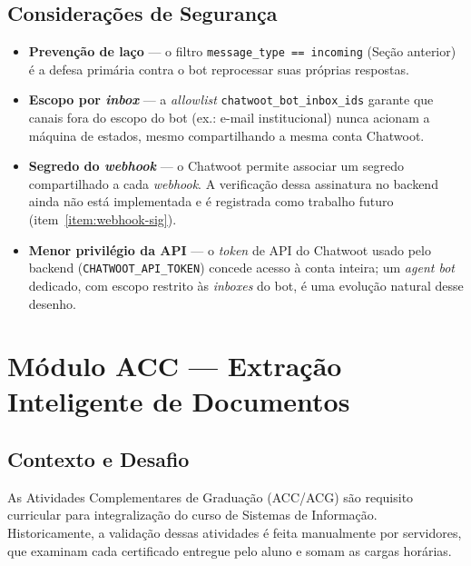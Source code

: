 \documentclass[12pt,a4paper]{report}
\begin{document}
\section{Considerações de Segurança}

\begin{itemize}
  \item \textbf{Prevenção de laço} — o filtro \texttt{message\_type ==
        incoming} (Seção anterior) é a defesa primária contra o bot
        reprocessar suas próprias respostas.
  \item \textbf{Escopo por \textit{inbox}} — a \textit{allowlist}
        \texttt{chatwoot\_bot\_inbox\_ids} garante que canais fora do
        escopo do bot (ex.: e-mail institucional) nunca acionam a máquina
        de estados, mesmo compartilhando a mesma conta Chatwoot.
  \item \textbf{Segredo do \textit{webhook}} — o Chatwoot permite associar
        um segredo compartilhado a cada \textit{webhook}. A verificação
        dessa assinatura no backend ainda não está implementada e é
        registrada como trabalho futuro (item~\ref{item:webhook-sig}).
  \item \textbf{Menor privilégio da API} — o \textit{token} de API do
        Chatwoot usado pelo backend (\texttt{CHATWOOT\_API\_TOKEN}) concede
        acesso à conta inteira; um \textit{agent bot} dedicado, com escopo
        restrito às \textit{inboxes} do bot, é uma evolução natural desse
        desenho.
\end{itemize}

\bigskip
{}

\chapter{Módulo ACC — Extração Inteligente de Documentos}

\section{Contexto e Desafio}

As Atividades Complementares de Graduação (ACC/ACG) são requisito curricular
para integralização do curso de Sistemas de Informação.
Historicamente, a validação dessas atividades é feita manualmente por
servidores, que examinam cada certificado entregue pelo aluno e somam
as cargas horárias.
\end{document}
